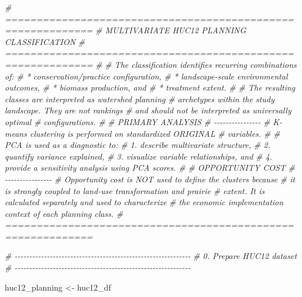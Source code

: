 \documentclass[
]{article}
\newenvironment{Shaded}{\begin{snugshade}}{\end{snugshade}}
\newcommand{\CommentTok}[1]{\textcolor[rgb]{0.56,0.35,0.01}{\textit{#1}}}
\newcommand{\NormalTok}[1]{#1}
\newcommand{\OtherTok}[1]{\textcolor[rgb]{0.56,0.35,0.01}{#1}}
\begin{document}
\begin{Shaded}
\begin{Highlighting}[]
\CommentTok{\# ============================================================}
\CommentTok{\# MULTIVARIATE HUC12 PLANNING CLASSIFICATION}
\CommentTok{\# ============================================================}
\CommentTok{\#}
\CommentTok{\# The classification identifies recurring combinations of:}
\CommentTok{\#   * conservation/practice configuration,}
\CommentTok{\#   * landscape{-}scale environmental outcomes,}
\CommentTok{\#   * biomass production, and}
\CommentTok{\#   * treatment extent.}
\CommentTok{\#}
\CommentTok{\# The resulting classes are interpreted as watershed planning}
\CommentTok{\# archetypes within the study landscape. They are not rankings}
\CommentTok{\# and should not be interpreted as universally optimal}
\CommentTok{\# configurations.}
\CommentTok{\#}
\CommentTok{\# PRIMARY ANALYSIS}
\CommentTok{\# {-}{-}{-}{-}{-}{-}{-}{-}{-}{-}{-}{-}{-}{-}{-}{-}}
\CommentTok{\# K{-}means clustering is performed on standardized ORIGINAL}
\CommentTok{\# variables.}
\CommentTok{\#}
\CommentTok{\# PCA is used as a diagnostic to:}
\CommentTok{\#   1. describe multivariate structure,}
\CommentTok{\#   2. quantify variance explained,}
\CommentTok{\#   3. visualize variable relationships, and}
\CommentTok{\#   4. provide a sensitivity analysis using PCA scores.}
\CommentTok{\#}
\CommentTok{\# OPPORTUNITY COST}
\CommentTok{\# {-}{-}{-}{-}{-}{-}{-}{-}{-}{-}{-}{-}{-}{-}{-}{-}}
\CommentTok{\# Opportunity cost is NOT used to define the clusters because}
\CommentTok{\# it is strongly coupled to land{-}use transformation and prairie}
\CommentTok{\# extent. It is calculated separately and used to characterize}
\CommentTok{\# the economic implementation context of each planning class.}
\CommentTok{\# ============================================================}


\CommentTok{\# {-}{-}{-}{-}{-}{-}{-}{-}{-}{-}{-}{-}{-}{-}{-}{-}{-}{-}{-}{-}{-}{-}{-}{-}{-}{-}{-}{-}{-}{-}{-}{-}{-}{-}{-}{-}{-}{-}{-}{-}{-}{-}{-}{-}{-}{-}{-}{-}{-}{-}{-}{-}{-}{-}{-}{-}{-}{-}{-}{-}}
\CommentTok{\# 0. Prepare HUC12 dataset}
\CommentTok{\# {-}{-}{-}{-}{-}{-}{-}{-}{-}{-}{-}{-}{-}{-}{-}{-}{-}{-}{-}{-}{-}{-}{-}{-}{-}{-}{-}{-}{-}{-}{-}{-}{-}{-}{-}{-}{-}{-}{-}{-}{-}{-}{-}{-}{-}{-}{-}{-}{-}{-}{-}{-}{-}{-}{-}{-}{-}{-}{-}{-}}

\NormalTok{huc12\_planning }\OtherTok{\textless{}{-}}\NormalTok{ huc12\_df}



\end{Highlighting}
\end{Shaded}
\end{document}
